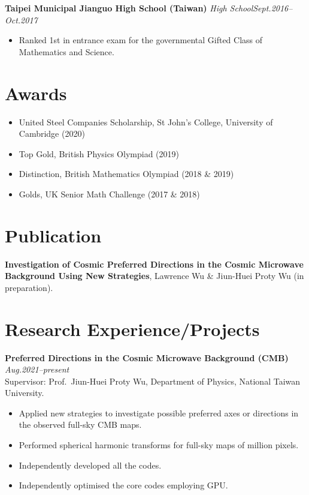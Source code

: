 \documentclass[11pt,a4paper,roman]{moderncv}        %
\begin{document}
\textbf{Taipei Municipal Jianguo High School (Taiwan)} \textit{High School}\hfill \textit{Sept.2016--Oct.2017}
\vspace*{1mm}
\begin{itemize}
\item{Ranked 1st in entrance exam for the governmental Gifted Class of Mathematics and Science.}
\end{itemize}

\section{Awards}
\begin{itemize}
	\item United Steel Companies Scholarship, St John's College, University of Cambridge (2020)
	\item Top Gold, British Physics Olympiad (2019)
	\item Distinction, British Mathematics Olympiad (2018 \& 2019)
\item{Golds, UK Senior Math Challenge (2017 \& 2018)}
\end{itemize}


\section{Publication}
\textbf{Investigation of Cosmic Preferred Directions in the Cosmic Microwave Background Using New Strategies}, Lawrence Wu \& Jiun-Huei Proty Wu (in preparation).

\section{Research Experience/Projects}

\textbf{Preferred Directions in the Cosmic Microwave Background (CMB)} \hfill \textit{Aug.2021--present}
\vspace*{1mm}\\
{Supervisor: Prof.\ Jiun-Huei Proty Wu, Department of Physics, National Taiwan University.}
\vspace*{1mm}
\begin{itemize}
	\item Applied new strategies to investigate possible preferred axes or directions in the observed full-sky CMB maps.
	\item Performed spherical harmonic transforms for full-sky maps of million pixels.
	\item Independently developed all the codes.
	\item Independently optimised the core codes employing GPU.\\
\end{itemize}
\end{document}
